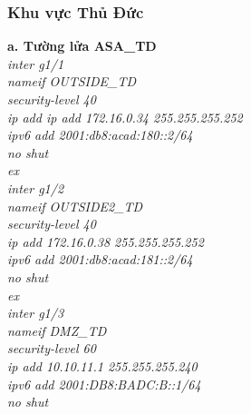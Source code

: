 \documentclass[a4paper, 12pt]{article}
\begin{document}
\subsubsection{Khu vực Thủ Đức }
\hspace*{1cm}\textbf{a. Tường lửa ASA\_TD}\\
\hspace*{2cm}\textit{inter g1/1\\
\hspace*{2cm}nameif OUTSIDE\_TD\\
\hspace*{2cm}security-level 40\\
\hspace*{2cm}ip add ip add 172.16.0.34 255.255.255.252\\
\hspace*{2cm}ipv6 add 2001:db8:acad:180::2/64\\
\hspace*{2cm}no shut \\
\hspace*{2cm}ex\\
\hspace*{2cm}inter g1/2\\
\hspace*{2cm}nameif OUTSIDE2\_TD\\
\hspace*{2cm}security-level 40\\
\hspace*{2cm}ip add 172.16.0.38 255.255.255.252\\
\hspace*{2cm}ipv6 add 2001:db8:acad:181::2/64\\
\hspace*{2cm}no shut \\
\hspace*{2cm}ex\\
\hspace*{2cm}inter g1/3\\
\hspace*{2cm}nameif DMZ\_TD\\
\hspace*{2cm}security-level 60\\
\hspace*{2cm}ip add 10.10.11.1 255.255.255.240\\
\hspace*{2cm}ipv6 add 2001:DB8:BADC:B::1/64\\
\hspace*{2cm}no shut\\
}
\end{document}
